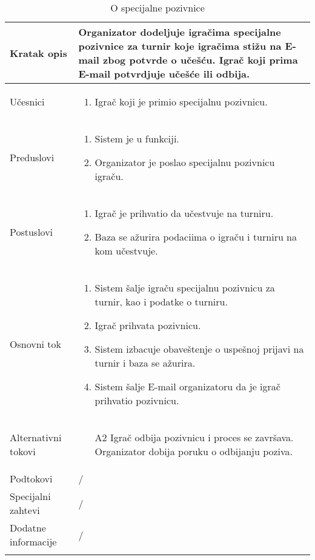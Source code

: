 \documentclass{article}
\begin{document}
\begin{longtable}{| p{} | p{} |} 
\hline
    Kratak opis & Organizator dodeljuje igračima specijalne pozivnice za turnir koje igračima stižu na E-mail zbog potvrde o učešću. Igrač koji prima E-mail potvrdjuje učešće ili odbija.\\ 
\hline    
    Učesnici & \begin{enumerate}
        \item Igrač koji je primio specijalnu pozivnicu.
    \end{enumerate}
    \\
\hline
   Preduslovi & \begin{enumerate}
       \item Sistem je u funkciji.
       \item Organizator je poslao specijalnu pozivnicu igraču.
   \end{enumerate}\\
\hline  
    Postuslovi & \begin{enumerate}
        \item Igrač je prihvatio da učestvuje na turniru.
        \item Baza se ažurira podaciima o igraču i turniru na kom učestvuje.
    \end{enumerate}\\
\hline
    Osnovni tok & \begin{enumerate}
        \item Sistem šalje igraču specijalnu pozivnicu za turnir, kao i podatke o turniru. 
        \item Igrač prihvata pozivnicu.
        \item Sistem izbacuje obaveštenje o uspešnoj prijavi na turnir i baza se ažurira.
        \item Sistem šalje E-mail organizatoru da je igrač prihvatio pozivnicu.
    \end{enumerate}\\
\hline
    Alternativni tokovi &
    \begin{itemize}
        \item[A2] Igrač odbija pozivnicu i proces se završava. Organizator dobija poruku o odbijanju poziva.
    \end{itemize}\item \\
\hline
    Podtokovi & /\\
\hline
    Specijalni zahtevi & /\\
\hline
    Dodatne informacije & / \\
\hline
 
\caption{O specijalne pozivnice} 
\end{longtable}
\end{document}
